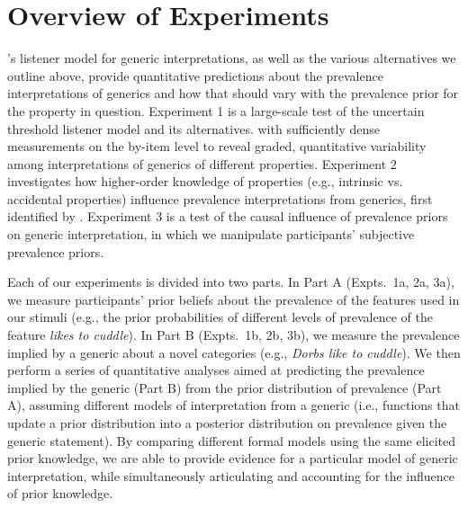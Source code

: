 \documentclass[floatsintext,doc]{apa6}
\begin{document}





\hypertarget{overview-of-experiments}{%
\section{Overview of Experiments}\label{overview-of-experiments}}

's listener model for generic interpretations, as well as the various alternatives we outline above, provide quantitative predictions about the prevalence interpretations of generics and how that should vary with the prevalence prior for the property in question.
Experiment 1 is a large-scale test of the uncertain threshold listener model and its alternatives. with sufficiently dense measurements on the by-item level to reveal graded, quantitative variability among interpretations of generics of different properties. 
Experiment 2 investigates how higher-order knowledge of properties (e.g., intrinsic vs. accidental properties) influence prevalence interpretations from generics, first identified by .
Experiment 3 is a test of the causal influence of prevalence priors on generic interpretation, in which we manipulate participants' subjective prevalence priors.

Each of our experiments is divided into two parts. 
In Part A (Expts.~1a, 2a, 3a), we measure participants' prior beliefs about the prevalence of the features used in our stimuli (e.g., the prior probabilities of different levels of prevalence of the feature \emph{likes to cuddle}). %
In Part B (Expts.~1b, 2b, 3b), we measure the prevalence implied by a generic about a novel categories (e.g., \emph{Dorbs like to cuddle}). 
We then perform a series of quantitative analyses aimed at predicting the prevalence implied by the generic (Part B) from the prior distribution of prevalence (Part A), assuming different models of interpretation from a generic (i.e., functions that update a prior distribution into a posterior distribution on prevalence given the generic statement). 
By comparing different formal models using the same elicited prior knowledge, we are able to provide evidence for a particular model of generic interpretation, while simultaneously articulating and accounting for the influence of prior knowledge. 
\end{document}
